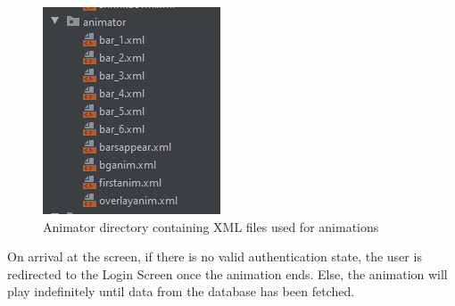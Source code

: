 \documentclass[../report.tex]{subfiles}
\begin{document}
\begin{figure}[H]
	\centering
	\includegraphics[width=.3\linewidth]{../images/07/02-anim-dir.png}
	\caption{Animator directory containing XML files used for animations}
	\label{fig:app-settings-screen}
\end{figure}

On arrival at the screen, if there is no valid authentication state, the user is redirected to the Login Screen once the animation ends. Else, the animation will play indefinitely until data from the database has been fetched.
\end{document}
